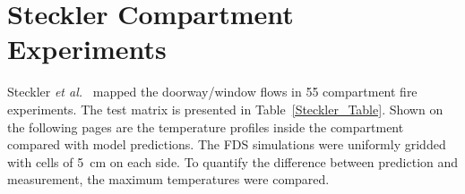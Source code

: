 \clearpage


\section{Steckler Compartment Experiments}

Steckler {\em et al.}~\cite{Steckler:NBSIR_82-2520} mapped the doorway/window flows in 55 compartment fire experiments. The test matrix
is presented in Table~\ref{Steckler_Table}. Shown on
the following pages are the temperature profiles inside the compartment compared with model predictions.  The FDS
simulations were uniformly gridded with cells of 5~cm on each side. To quantify the difference between prediction and measurement, the
maximum temperatures were compared.

\newpage



